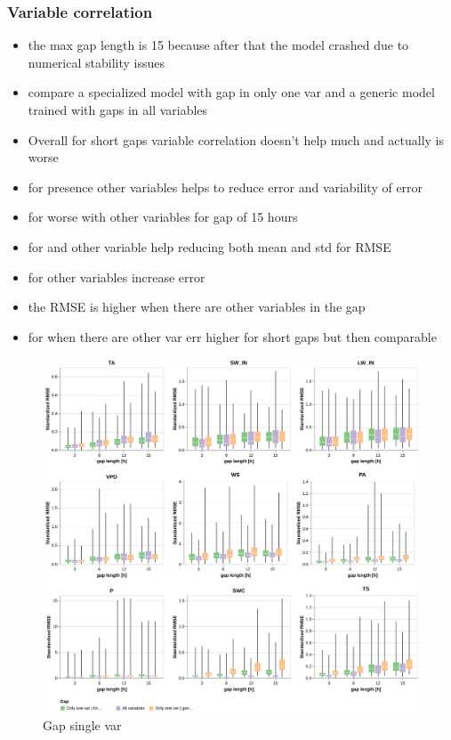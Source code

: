 \documentclass{article}
\newcommand{\imgwidth}{6in}
\begin{document}
\subsubsection{Variable correlation}

\begin{itemize}
    \item the max gap length is 15 because after that the model crashed due to numerical stability issues
    \item compare a specialized model with gap in only one var and a generic model trained with gaps in all variables
    \item Overall for short gaps variable correlation doesn't help much and actually is worse
    \item for  presence other variables helps to reduce error and variability of error
    \item for  worse with other variables for gap of 15 hours
    \item for  and  other variable help reducing both mean and std for RMSE 
    \item for  other variables increase error
    \item {} the RMSE is higher when there are other variables in the gap
    \item for  when there are other var err higher for short gaps but then comparable
\end{itemize}

\begin{figure}
\centerline{\includegraphics[width=\imgwidth]{images2/gap_single_var}}
\caption{Gap single var}
\label{fig:gap_single_var}
\end{figure}
\end{document}
